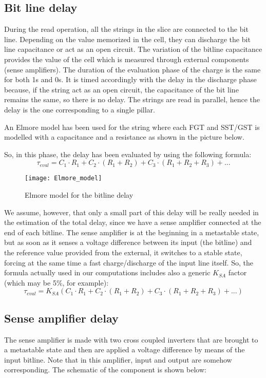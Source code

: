\subsection{Bit line delay}
During the read operation, all the strings in the slice are connected to the bit line. Depending on the value memorized in the cell, they can discharge the bit line capacitance or act as an open circuit. The variation of the bitline capacitance provides the value of the cell which is measured through external components (sense amplifiers). The duration of the evaluation phase of the charge is the same for both 1s and 0s. It is timed accordingly with the delay in the discharge phase because, if the string act as an open circuit, the capacitance of the bit line remains the same, so there is no delay. The strings are read in parallel, hence the delay is the one corresponding to a single pillar. 

An Elmore model has been used for the string where each FGT and SST/GST is modelled with a capacitance and a resistance as shown in the picture below.

So, in this phase, the delay has been evaluated by using the following formula:
$$\tau_{eval}=C_1 \cdot R_1 + C_2 \cdot (R_1+R_2) + C_3 \cdot (R_1+R_2+R_3)+...$$

\begin{figure}[h] 
	\begin{center}
		\texttt{[image: Elmore\_model]}
	\end{center}
	\caption{Elmore model for the bitline delay} 
\end{figure}
 
We assume, however, that only a small part of this delay will be really needed in the estimation of the total delay, since we have a sense amplifier connected at the end of each bitline. The sense amplifier is at the beginning in a metastable state, but as soon as it senses a voltage difference between its input (the bitline) and the reference value provided from the external, it switches to a stable state, forcing at the same time a fast charge/discharge of the input line itself. So, the formula actually used in our computations includes also a generic $K_{SA}$ factor (which may be 5\%, for example):
$$\tau_{eval}=K_{SA}(C_1 \cdot R_1 + C_2 \cdot (R_1+R_2) + C_3 \cdot (R_1+R_2+R_3)+...)$$

\subsection{Sense amplifier delay}
The sense amplifier is made with two cross coupled inverters that are brought to a metastable state and then are applied a voltage difference by means of the input bitline. Note that in this amplifier, input and output are somehow corresponding. The schematic of the component is shown below:

